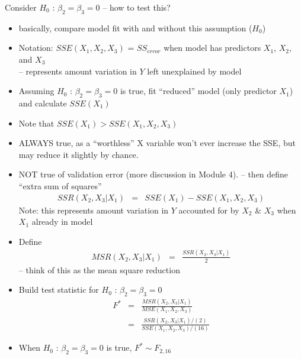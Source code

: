 \documentclass[12pt]{notes}
\begin{document}
Consider $H_0$ : $\beta_2=\beta_3=0$ -- how to test this?
\begin{itemize}
  \item basically, compare model fit with and without this
  assumption ($H_0$)
  \item Notation: $SSE(X_1,X_2,X_3)$ = $SS_{error}$ when model has
  predictors $X_1$, $X_2$, and $X_3$\\
  -- represents amount variation in $Y$ left unexplained by model
  \item Assuming $H_0$ : $\beta_2=\beta_3=0$ is true, fit
  ``reduced'' model (only predictor $X_1$) and calculate
  $SSE(X_1)$
  \item Note that $SSE(X_1) > 
  SSE(X_1,X_2,X_3)$\\
\bi
\item ALWAYS true, as a ``worthless'' X variable won't ever increase the SSE, but may reduce it slightly by chance. 
\item NOT true of validation error (more discussion in Module 4). 
\ei
  -- then define ``extra sum of squares''
  \begin{eqnarray}
    SSR(X_2,X_3 | X_1) & = & SSE(X_1) - SSE(X_1,X_2,X_3) \nonumber
  \end{eqnarray}
  Note: this represents amount variation in $Y$ accounted for by
  $X_2$ \& $X_3$ when $X_1$ already in model
  \item Define
  \begin{eqnarray}
    MSR(X_2,X_3 | X_1) & = & \frac{SSR(X_2,X_3|X_1)}{2} \nonumber
  \end{eqnarray}
  -- think of this as the mean square reduction\\ \vspace{2em}
  \item Build test statistic for $H_0$ : $\beta_2=\beta_3=0$
  \begin{eqnarray}
     F^* & = & \frac{MSR(X_2,X_3 | X_1)}{MSE(X_1,X_2,X_3)} \nonumber    \\
         & = & \frac{SSR(X_2,X_3|X_1) / (2)}{SSE(X_1,X_2,X_3) / (16)} \nonumber
  \end{eqnarray}

  \item When $H_0$ : $\beta_2=\beta_3=0$  is true, $F^* \sim
  F_{2,16}$
\end{itemize}
\end{document}
